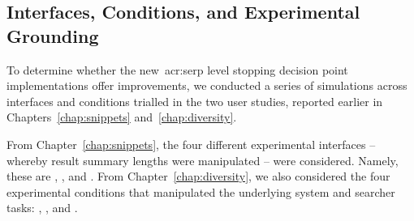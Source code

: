 \subsection{Interfaces, Conditions, and Experimental Grounding}\label{sec:serp:method:probscosts}
To determine whether the new~\gls{acr:serp} level stopping decision point implementations offer improvements, we conducted a series of simulations across interfaces and conditions trialled in the two user studies, reported earlier in Chapters~\ref{chap:snippets} and~\ref{chap:diversity}.

From Chapter~\ref{chap:snippets}, the four different experimental interfaces -- whereby result summary lengths were manipulated -- were considered. Namely, these are , ,  and . From Chapter~\ref{chap:diversity}, we also considered the four experimental conditions that manipulated the underlying system and searcher tasks: , ,  and .

